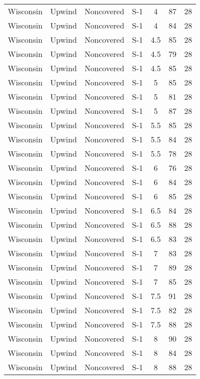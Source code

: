 \documentclass{article}
\begin{document}
\begin{longtable}[H]{ccccccc}
Wisconsin & Upwind   & Noncovered & S-1 & 4    & 87  & 28 \\
Wisconsin & Upwind   & Noncovered & S-1 & 4    & 84  & 28 \\
Wisconsin & Upwind   & Noncovered & S-1 & 4.5  & 85  & 28 \\
Wisconsin & Upwind   & Noncovered & S-1 & 4.5  & 79  & 28 \\
Wisconsin & Upwind   & Noncovered & S-1 & 4.5  & 85  & 28 \\
Wisconsin & Upwind   & Noncovered & S-1 & 5    & 85  & 28 \\
Wisconsin & Upwind   & Noncovered & S-1 & 5    & 81  & 28 \\
Wisconsin & Upwind   & Noncovered & S-1 & 5    & 87  & 28 \\
Wisconsin & Upwind   & Noncovered & S-1 & 5.5  & 85  & 28 \\
Wisconsin & Upwind   & Noncovered & S-1 & 5.5  & 84  & 28 \\
Wisconsin & Upwind   & Noncovered & S-1 & 5.5  & 78  & 28 \\
Wisconsin & Upwind   & Noncovered & S-1 & 6    & 76  & 28 \\
Wisconsin & Upwind   & Noncovered & S-1 & 6    & 84  & 28 \\
Wisconsin & Upwind   & Noncovered & S-1 & 6    & 85  & 28 \\
Wisconsin & Upwind   & Noncovered & S-1 & 6.5  & 84  & 28 \\
Wisconsin & Upwind   & Noncovered & S-1 & 6.5  & 88  & 28 \\
Wisconsin & Upwind   & Noncovered & S-1 & 6.5  & 83  & 28 \\
Wisconsin & Upwind   & Noncovered & S-1 & 7    & 83  & 28 \\
Wisconsin & Upwind   & Noncovered & S-1 & 7    & 89  & 28 \\
Wisconsin & Upwind   & Noncovered & S-1 & 7    & 85  & 28 \\
Wisconsin & Upwind   & Noncovered & S-1 & 7.5  & 91  & 28 \\
Wisconsin & Upwind   & Noncovered & S-1 & 7.5  & 82  & 28 \\
Wisconsin & Upwind   & Noncovered & S-1 & 7.5  & 88  & 28 \\
Wisconsin & Upwind   & Noncovered & S-1 & 8    & 90  & 28 \\
Wisconsin & Upwind   & Noncovered & S-1 & 8    & 84  & 28 \\
Wisconsin & Upwind   & Noncovered & S-1 & 8    & 88  & 28 \\

\end{longtable}
\end{document}

